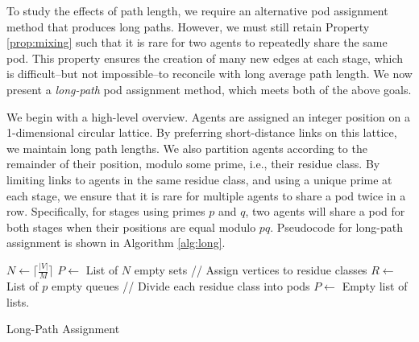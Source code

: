 To study the effects of path length, we require an alternative pod assignment method that produces long paths.
However, we must still retain Property \ref{prop:mixing} such that it is rare for two agents to repeatedly share the same pod.
This property ensures the creation of many new edges at each stage, which is difficult--but not impossible--to reconcile with long average path length.
We now present a {\em long-path} pod assignment method, which meets both of the above goals.

We begin with a high-level overview.
Agents are assigned an integer position on a 1-dimensional circular lattice.
By preferring short-distance links on this lattice, we maintain long path lengths.
We also partition agents according to the remainder of their position, modulo some prime, i.e., their residue class.
By limiting links to agents in the same residue class, and using a unique prime at each stage, we ensure that it is rare for multiple agents to share a pod twice in a row.
Specifically, for stages using primes $p$ and $q$, two agents will share a pod for both stages when their positions are equal modulo $pq$. Pseudocode for long-path assignment is shown in Algorithm \ref{alg:long}.

\begin{algorithm}
\SetAlgoLined
\DontPrintSemicolon
{}
    $N \longleftarrow \lceil \frac{|V|}{M} \rceil$ \;
    $P \longleftarrow$ List of $N$ empty sets \;
    // Assign vertices to residue classes \;
    $R \longleftarrow$ List of $p$ empty queues \;     
    // Divide each residue class into pods \;
    $P \longleftarrow $ Empty list of lists. \;
\caption{Long-Path Assignment}
\label{alg:long}
\end{algorithm}


